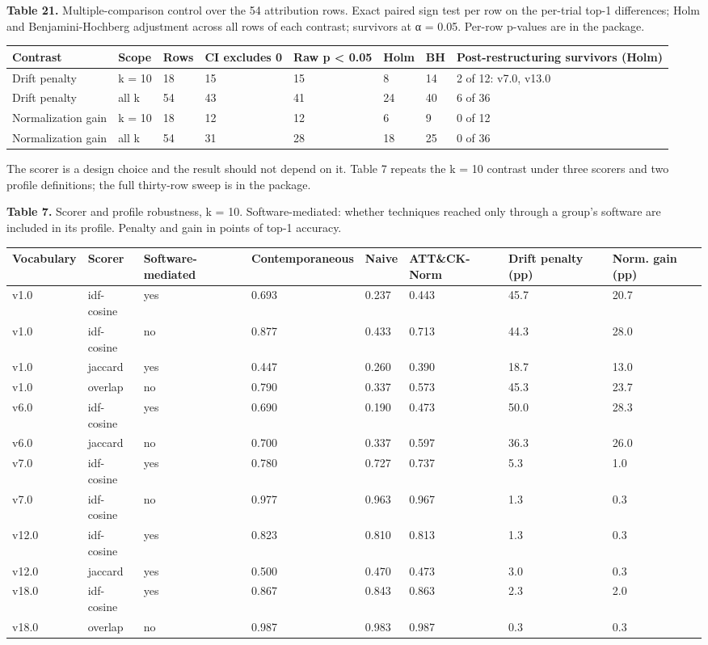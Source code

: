 \documentclass[11pt,a4paper]{article}
\begin{document}
\textbf{Table 21.} Multiple-comparison control over the 54 attribution rows. Exact paired sign test per row on the per-trial top-1 differences; Holm and Benjamini-Hochberg adjustment across all rows of each contrast; survivors at α = 0.05. Per-row p-values are in the package.

\begin{center}\footnotesize
\begin{tabular}{llllllll}
\toprule
Contrast & Scope & Rows & CI excludes 0 & Raw p < 0.05 & Holm & BH & Post-restructuring survivors (Holm) \\
\midrule
Drift penalty & k = 10 & 18 & 15 & 15 & 8 & 14 & 2 of 12: v7.0, v13.0 \\
Drift penalty & all k & 54 & 43 & 41 & 24 & 40 & 6 of 36 \\
Normalization gain & k = 10 & 18 & 12 & 12 & 6 & 9 & 0 of 12 \\
Normalization gain & all k & 54 & 31 & 28 & 18 & 25 & 0 of 36 \\
\bottomrule
\end{tabular}
\end{center}

The scorer is a design choice and the result should not depend on it. Table 7 repeats the k = 10 contrast under three scorers and two profile definitions; the full thirty-row sweep is in the package.

\textbf{Table 7.} Scorer and profile robustness, k = 10. Software-mediated: whether techniques reached only through a group's software are included in its profile. Penalty and gain in points of top-1 accuracy.

\begin{center}\footnotesize
\begin{tabular}{llllllll}
\toprule
Vocabulary & Scorer & Software-mediated & Contemporaneous & Naive & ATT\&CK-Norm & Drift penalty (pp) & Norm. gain (pp) \\
\midrule
v1.0 & idf-cosine & yes & 0.693 & 0.237 & 0.443 & 45.7 & 20.7 \\
v1.0 & idf-cosine & no & 0.877 & 0.433 & 0.713 & 44.3 & 28.0 \\
v1.0 & jaccard & yes & 0.447 & 0.260 & 0.390 & 18.7 & 13.0 \\
v1.0 & overlap & no & 0.790 & 0.337 & 0.573 & 45.3 & 23.7 \\
v6.0 & idf-cosine & yes & 0.690 & 0.190 & 0.473 & 50.0 & 28.3 \\
v6.0 & jaccard & no & 0.700 & 0.337 & 0.597 & 36.3 & 26.0 \\
v7.0 & idf-cosine & yes & 0.780 & 0.727 & 0.737 & 5.3 & 1.0 \\
v7.0 & idf-cosine & no & 0.977 & 0.963 & 0.967 & 1.3 & 0.3 \\
v12.0 & idf-cosine & yes & 0.823 & 0.810 & 0.813 & 1.3 & 0.3 \\
v12.0 & jaccard & yes & 0.500 & 0.470 & 0.473 & 3.0 & 0.3 \\
v18.0 & idf-cosine & yes & 0.867 & 0.843 & 0.863 & 2.3 & 2.0 \\
v18.0 & overlap & no & 0.987 & 0.983 & 0.987 & 0.3 & 0.3 \\
\bottomrule
\end{tabular}
\end{center}
\end{document}
